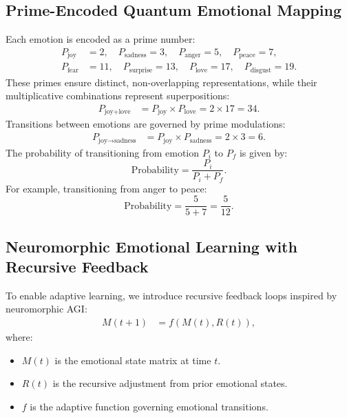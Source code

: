 \documentclass{article}
\theoremstyle{plain}
\begin{document}
\subsection{Prime-Encoded Quantum Emotional Mapping}
Each emotion is encoded as a prime number:
\begin{align}
    P_{\text{joy}} &= 2, \quad P_{\text{sadness}} = 3, \quad P_{\text{anger}} = 5, \quad P_{\text{peace}} = 7, \\
    P_{\text{fear}} &= 11, \quad P_{\text{surprise}} = 13, \quad P_{\text{love}} = 17, \quad P_{\text{disgust}} = 19.
\end{align}
These primes ensure distinct, non-overlapping representations, while their multiplicative combinations represent superpositions:
\begin{align}
    P_{\text{joy+love}} &= P_{\text{joy}} \times P_{\text{love}} = 2 \times 17 = 34.
\end{align}
Transitions between emotions are governed by prime modulations:
\begin{align}
    P_{\text{joy} \rightarrow \text{sadness}} &= P_{\text{joy}} \times P_{\text{sadness}} = 2 \times 3 = 6.
\end{align}
The probability of transitioning from emotion \( P_i \) to \( P_f \) is given by:
\begin{equation}
    \text{Probability} = \frac{P_i}{P_i + P_f}.
\end{equation}
For example, transitioning from anger to peace:
\begin{equation}
    \text{Probability} = \frac{5}{5+7} = \frac{5}{12}.
\end{equation}

\subsection{Neuromorphic Emotional Learning with Recursive Feedback}
To enable adaptive learning, we introduce recursive feedback loops inspired by neuromorphic AGI:
\begin{align}
    M(t+1) &= f(M(t), R(t)),
\end{align}
where:
\begin{itemize}
    \item \( M(t) \) is the emotional state matrix at time \( t \).
    \item \( R(t) \) is the recursive adjustment from prior emotional states.
    \item \( f \) is the adaptive function governing emotional transitions.
\end{itemize}
\end{document}
